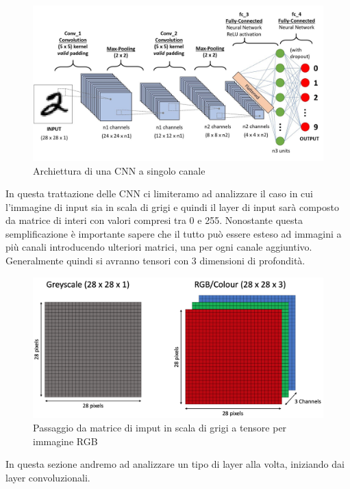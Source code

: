 \documentclass[12pt,a4paper,openright,twoside]{report}
\begin{document}
\begin{figure}[h]
\centering
\includegraphics[width=\linewidth]{CNN_main.jpeg}
\caption{Archiettura di una CNN a singolo canale}
\end{figure}
In questa trattazione delle CNN ci limiteramo ad analizzare il caso in cui l'immagine di input sia in scala di grigi e quindi il layer di input sarà composto da matrice di interi con valori compresi tra 0 e 255.
Nonostante questa semplificazione è importante sapere che il tutto può essere esteso ad immagini a più canali introducendo ulteriori matrici, una per ogni canale aggiuntivo. Generalmente quindi si avranno tensori con 3 dimensioni di profondità. 
\newpage
\begin{figure}[h]
\centering
\includegraphics[width=\linewidth]{greyscaletorgb.png}
\caption{Passaggio da matrice di imput in scala di grigi a tensore per immagine RGB}
\end{figure}

In questa sezione andremo ad analizzare un tipo di layer alla volta, iniziando dai layer convoluzionali.
\end{document}

